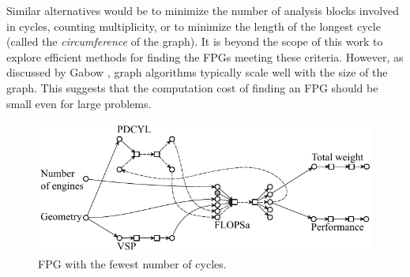	Similar alternatives would be to minimize the number of analysis blocks involved in cycles, counting multiplicity, or to minimize the length of the longest cycle (called the \emph{circumference} of the graph). It is beyond the scope of this work to explore efficient methods for finding the FPGs meeting these criteria. However, as discussed by Gabow \cite{Gabow1985}, graph algorithms typically scale well with the size of the graph. This suggests that the computation cost of finding an FPG should be small even for large problems.
	\begin{figure}[htb!]
	  \begin{center}
		\includegraphics[width=4.5in]{images/FPG_edit_fewest_cycles}
	  \end{center}
	  \caption{FPG with the fewest number of cycles.}
	\label{f:FPG fewest cycles}
	\end{figure}

